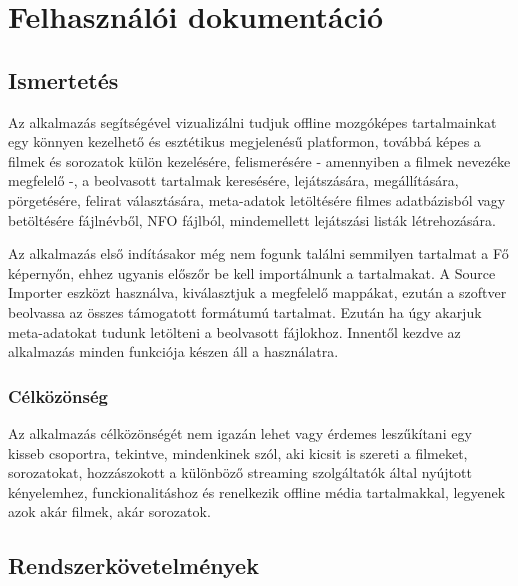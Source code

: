 \chapter{Felhasználói dokumentáció} %
\label{ch:user}

\section{Ismertetés}
Az alkalmazás segítségével vizualizálni tudjuk offline mozgóképes tartalmainkat egy könnyen kezelhető és esztétikus megjelenésű platformon, továbbá képes a filmek és sorozatok külön kezelésére, felismerésére - amennyiben a filmek nevezéke megfelelő -, a beolvasott tartalmak keresésére, lejátszására, megállítására, pörgetésére, felirat választására, meta-adatok letöltésére filmes adatbázisból vagy betöltésére fájlnévből, NFO fájlból, mindemellett lejátszási listák létrehozására.

Az alkalmazás első indításakor még nem fogunk találni semmilyen tartalmat a Fő képernyőn, ehhez ugyanis előszőr be kell importálnunk a tartalmakat. A Source Importer eszközt használva, kiválasztjuk a megfelelő mappákat, ezután a szoftver beolvassa az összes támogatott formátumú tartalmat. Ezután ha úgy akarjuk meta-adatokat tudunk letölteni a beolvasott fájlokhoz. Innentől kezdve az alkalmazás minden funkciója készen áll a használatra.

\subsection{Célközönség}
Az alkalmazás célközönségét nem igazán lehet vagy érdemes leszűkítani egy kisseb csoportra, tekintve, mindenkinek szól, aki kicsit is szereti a filmeket, sorozatokat, hozzászokott a különböző streaming szolgáltatók által nyújtott kényelemhez, funckionalitáshoz és renelkezik offline média tartalmakkal, legyenek azok akár filmek, akár sorozatok.

\section{Rendszerkövetelmények}
